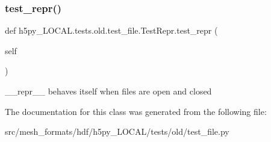 \subsubsection{\texorpdfstring{test\+\_\+repr()}{test\_repr()}}
{\footnotesize\ttfamily def h5py\+\_\+\+L\+O\+C\+A\+L.\+tests.\+old.\+test\+\_\+file.\+Test\+Repr.\+test\+\_\+repr (\begin{DoxyParamCaption}\item[{}]{self }\end{DoxyParamCaption})}

\begin{DoxyVerb}__repr__ behaves itself when files are open and closed \end{DoxyVerb}
 

The documentation for this class was generated from the following file\+:\begin{DoxyCompactItemize}
\item 
src/mesh\+\_\+formats/hdf/h5py\+\_\+\+L\+O\+C\+A\+L/tests/old/test\+\_\+file.\+py\end{DoxyCompactItemize}
